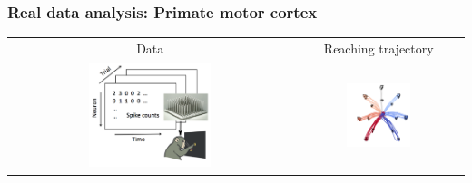 \documentclass[16pt,presentation]{beamer}
\begin{document}


\begin{frame}
\frametitle{Real data analysis: Primate motor cortex}
\begin{tabular}{ cc } 
{\small Data} & {\small Reaching trajectory} \\
\includegraphics[width = 0.45\textwidth]{./figs/gclds/fig_monkey.png}&
\includegraphics[width = 0.40\textwidth]{./figs/flds/fig_GeorgeMove_trajectory.pdf}
\end{tabular}
\end{frame}
\end{document}
